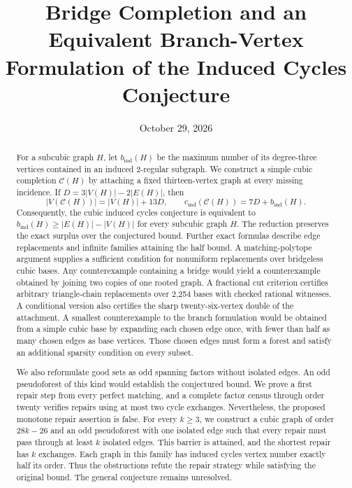 \documentclass[11pt]{article}
\title{Bridge Completion and an Equivalent Branch-Vertex\\
Formulation of the Induced Cycles Conjecture}
\author{}
\date{October 29, 2026}
\newcommand{\cind}{c_{\mathrm{ind}}}
\newcommand{\bind}{b_{\mathrm{ind}}}
\begin{document}
\maketitle

\begin{abstract}
For a subcubic graph $H$, let $\bind(H)$ be the maximum number of its
degree-three vertices contained in an induced $2$-regular subgraph.
We construct a simple cubic completion $\mathcal C(H)$ by attaching a
fixed thirteen-vertex graph at every missing incidence. If
$D=3|V(H)|-2|E(H)|$, then
\[
 |V(\mathcal C(H))|=|V(H)|+13D,\qquad
 \cind(\mathcal C(H))=7D+\bind(H).
\]
Consequently, the cubic induced cycles conjecture is equivalent to
$\bind(H)\geq |E(H)|-|V(H)|$ for every subcubic graph $H$.
The reduction preserves the exact surplus over the conjectured bound.
Further exact formulas describe edge replacements and infinite
families attaining the half bound. A matching-polytope argument
supplies a sufficient condition for nonuniform replacements over
bridgeless cubic bases. Any counterexample containing a bridge would
yield a counterexample obtained by joining two copies of one rooted
graph.
A fractional cut criterion certifies arbitrary triangle-chain
replacements over 2,254 bases with checked rational witnesses.
A conditional version also certifies the sharp twenty-six-vertex
double of the attachment. A smallest counterexample to the branch
formulation would be obtained from a simple cubic base by expanding
each chosen edge once, with fewer than half as many chosen edges as
base vertices. Those chosen edges must form a forest and satisfy
an additional sparsity condition on every subset.

We also reformulate good sets as odd spanning factors without
isolated edges. An odd pseudoforest of this kind would establish
the conjectured bound. We prove a first repair step from every
perfect matching, and a complete factor census through order twenty
verifies repairs using at most two cycle exchanges. Nevertheless,
the proposed monotone repair assertion is false. For every $k\geq3$,
we construct a cubic graph of order $28k-26$ and an odd pseudoforest
with one isolated edge such that every repair must pass through at
least $k$ isolated edges. This barrier is attained, and the shortest
repair has $k$ exchanges. Each graph in this family has induced
cycles vertex number exactly half its order. Thus the obstructions
refute the repair strategy while satisfying the original bound.
The general conjecture remains unresolved.
\end{abstract}
\end{document}
